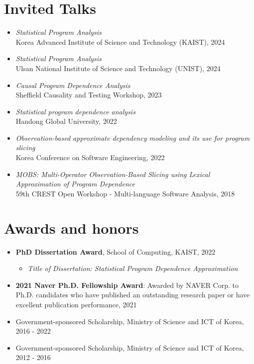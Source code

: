 \documentclass[letterpaper,11pt]{article}
\begin{document}
\section{Invited Talks}
\begin{itemize}
  \item \emph{Statistical Program Analysis} \\ Korea Advanced Institute of Science and Technology (KAIST), 2024
  \item \emph{Statistical Program Analysis} \\ Ulsan National Institute of Science and Technology (UNIST), 2024
  \item \emph{Causal Program Dependence Analysis} \\ Sheffield Causality and Testing Workshop, 2023
  \item \emph{Statistical program dependence analysis} \\ Handong Global University, 2022
  \item \emph{Observation-based approximate dependency modeling and its use for program slicing} \\ Korea Conference on Software Engineering, 2022
  \item \emph{MOBS: Multi-Operator Observation-Based Slicing using Lexical Approximation of Program Dependence} \\ 59th CREST Open Workshop - Multi-language Software Analysis, 2018
\end{itemize}

\section{Awards and honors}
\begin{itemize}
  \item \textbf{PhD Dissertation Award}, School of Computing, KAIST, 2022
        \vspace{-5pt}\begin{itemize}
          \item \emph{Title of Dissertation: Statistical Program Dependence Approximation}
        \end{itemize}
  \item \textbf{2021 Naver Ph.D. Fellowship Award}: Awarded by NAVER Corp. to Ph.D. candidates who have published an outstanding research paper or have excellent publication performance, 2021
  \item Government-sponsored Scholarship, Ministry of Science and ICT of Korea, 2016 - 2022
  \item Government-sponsored Scholarship, Ministry of Science and ICT of Korea, 2012 - 2016
\end{itemize}
\end{document}
